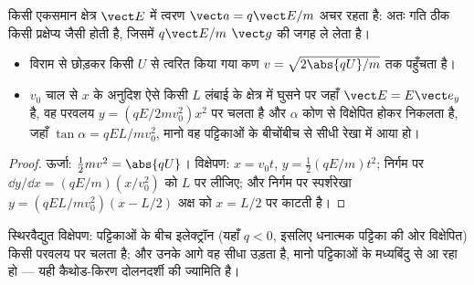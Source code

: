 \begin{proposition}[त्वरण और विक्षेपण]\label{prop:b1:charged-particles:efield}
किसी एकसमान क्षेत्र $\vect E$ में त्वरण $\vect a = q\vect E/m$ अचर रहता है:
अतः गति ठीक किसी प्रक्षेप्य जैसी होती है, जिसमें $q\vect E/m$ $\vect g$
की जगह ले लेता है।
\begin{itemize}
  \item विराम से छोड़कर किसी  $U$ से त्वरित किया गया कण
        $v = \sqrt{2\abs{qU}/m}$ तक पहुँचता है।
  \item $v_0$ चाल से $x$ के अनुदिश ऐसे किसी $L$ लंबाई के क्षेत्र में
        घुसने पर जहाँ $\vect E = E\vect e_y$ है, वह परवलय
        $y = (qE/2mv_0^2)x^2$ पर चलता है और $\alpha$ कोण से विक्षेपित होकर
        निकलता है, जहाँ $\tan\alpha =
        qEL/mv_0^2$, मानो वह पट्टिकाओं के बीचोंबीच से सीधी रेखा में आया
        हो।
\end{itemize}
\end{proposition}

\begin{proof}
ऊर्जा: $\tfrac12 mv^2 = \abs{qU}$। विक्षेपण: $x = v_0t$, $y =
\tfrac12(qE/m)t^2$; निर्गम पर $\dd y/\dd x = (qE/m)(x/v_0^2)$ को
$L$ पर लीजिए; और निर्गम पर स्पर्शरेखा $y = (qEL/mv_0^2)(x - L/2)$ अक्ष को
$x = L/2$ पर काटती है।
\end{proof}

\begin{omfigure}

{\small स्थिरवैद्युत विक्षेपण: पट्टिकाओं के बीच इलेक्ट्रॉन (यहाँ
$q < 0$, इसलिए धनात्मक पट्टिका की ओर विक्षेपित) किसी परवलय पर चलता है; और
उनके आगे वह सीधा उड़ता है, मानो पट्टिकाओं के मध्यबिंदु से आ रहा हो
--- यही कैथोड-किरण दोलनदर्शी की ज्यामिति है।}
\end{omfigure}

